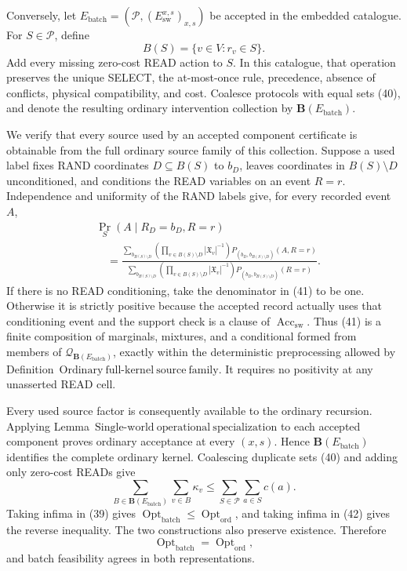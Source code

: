 Conversely, let
\(E_{\mathrm{batch}}=(\mathcal P,(E_{\mathrm{sw}}^{x,s})_{x,s})\)
be accepted in the embedded catalogue.  For \(S\in\mathcal P\), define
\[
 B(S)=\{v\in V:r_v\in S\}.
 \tag{40}
\]
Add every missing zero-cost READ action to \(S\).  In this catalogue, that operation preserves the unique SELECT, the at-most-once rule, precedence, absence of conflicts, physical compatibility, and cost.  Coalesce protocols with equal sets (40), and denote the resulting ordinary intervention collection by \(\mathbf B(E_{\mathrm{batch}})\).

We verify that every source used by an accepted component certificate is obtainable from the full ordinary source family of this collection.  Suppose a used label fixes RAND coordinates \(D\subseteq B(S)\) to \(b_D\), leaves coordinates in \(B(S)\setminus D\) unconditioned, and conditions the READ variables on an event \(R=r\).  Independence and uniformity of the RAND labels give, for every recorded event \(A\),
\[
\begin{aligned}
 &\Pr_S(A\mid R_D=b_D,R=r)\\
 &\quad=
 \frac{\displaystyle
  \sum_{b_{B(S)\setminus D}}
  \left(\prod_{v\in B(S)\setminus D}|\mathfrak X_v|^{-1}\right)
  P_{(b_D,b_{B(S)\setminus D})}(A,R=r)}
 {\displaystyle
  \sum_{b_{B(S)\setminus D}}
  \left(\prod_{v\in B(S)\setminus D}|\mathfrak X_v|^{-1}\right)
  P_{(b_D,b_{B(S)\setminus D})}(R=r)}.
\end{aligned}
\tag{41}
\]
If there is no READ conditioning, take the denominator in (41) to be one.  Otherwise it is strictly positive because the accepted record actually uses that conditioning event and the support check is a clause of \(\operatorname{Acc}_{\mathrm{sw}}\).  Thus (41) is a finite composition of marginals, mixtures, and a conditional formed from members of
\(\mathcal Q_{\mathbf B(E_{\mathrm{batch}})}\), exactly within the deterministic preprocessing allowed by Definition~\(\mathrm{Ordinary\ full\mbox{-}kernel\ source\ family}\).  It requires no positivity at any unasserted READ cell.

Every used source factor is consequently available to the ordinary recursion.  Applying Lemma~\(\mathrm{Single\mbox{-}world\ operational\ specialization}\) to each accepted component proves ordinary acceptance at every \((x,s)\).  Hence \(\mathbf B(E_{\mathrm{batch}})\) identifies the complete ordinary kernel.  Coalescing duplicate sets (40) and adding only zero-cost READs give
\[
 \sum_{B\in\mathbf B(E_{\mathrm{batch}})}\sum_{v\in B}\kappa_v
 \leq \sum_{S\in\mathcal P}\sum_{a\in S}c(a).
 \tag{42}
\]
Taking infima in (39) gives
\(\operatorname{Opt}_{\mathrm{batch}}\leq\operatorname{Opt}_{\mathrm{ord}}\),
and taking infima in (42) gives the reverse inequality.  The two constructions also preserve existence.  Therefore
\[
 \operatorname{Opt}_{\mathrm{batch}}=\operatorname{Opt}_{\mathrm{ord}},
 \tag{43}
\]
and batch feasibility agrees in both representations.

